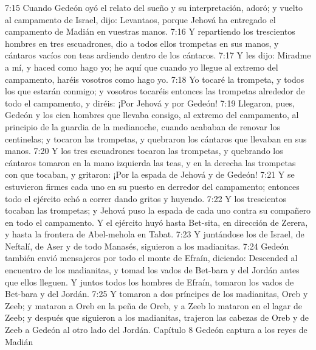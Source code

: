 7:15 Cuando Gedeón oyó el relato del sueño y su interpretación, adoró; y vuelto al campamento de Israel, dijo: Levantaos, porque Jehová ha entregado el campamento de Madián en vuestras manos.  
7:16 Y repartiendo los trescientos hombres en tres escuadrones, dio a todos ellos trompetas en sus manos, y cántaros vacíos con teas ardiendo dentro de los cántaros.  
7:17 Y les dijo: Miradme a mí, y haced como hago yo; he aquí que cuando yo llegue al extremo del campamento, haréis vosotros como hago yo.  
7:18 Yo tocaré la trompeta, y todos los que estarán conmigo; y vosotros tocaréis entonces las trompetas alrededor de todo el campamento, y diréis: ¡Por Jehová y por Gedeón!  
7:19 Llegaron, pues, Gedeón y los cien hombres que llevaba consigo, al extremo del campamento, al principio de la guardia de la medianoche, cuando acababan de renovar los centinelas; y tocaron las trompetas, y quebraron los cántaros que llevaban en sus manos.  
7:20 Y los tres escuadrones tocaron las trompetas, y quebrando los cántaros tomaron en la mano izquierda las teas, y en la derecha las trompetas con que tocaban, y gritaron: ¡Por la espada de Jehová y de Gedeón!  
7:21 Y se estuvieron firmes cada uno en su puesto en derredor del campamento; entonces todo el ejército echó a correr dando gritos y huyendo.  
7:22 Y los trescientos tocaban las trompetas; y Jehová puso la espada de cada uno contra su compañero en todo el campamento. Y el ejército huyó hasta Bet-sita, en dirección de Zerera, y hasta la frontera de Abel-mehola en Tabat.  
7:23 Y juntándose los de Israel, de Neftalí, de Aser y de todo Manasés, siguieron a los madianitas.  
7:24 Gedeón también envió mensajeros por todo el monte de Efraín, diciendo: Descended al encuentro de los madianitas, y tomad los vados de Bet-bara y del Jordán antes que ellos lleguen. Y juntos todos los hombres de Efraín, tomaron los vados de Bet-bara y del Jordán.  
7:25 Y tomaron a dos príncipes de los madianitas, Oreb y Zeeb; y mataron a Oreb en la peña de Oreb, y a Zeeb lo mataron en el lagar de Zeeb; y después que siguieron a los madianitas, trajeron las cabezas de Oreb y de Zeeb a Gedeón al otro lado del Jordán.  
Capítulo 8 
Gedeón captura a los reyes de Madián  

